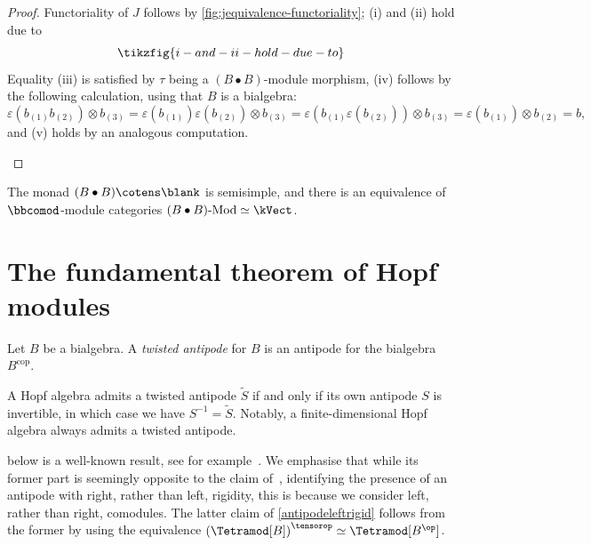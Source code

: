 \begin{proof}
  Functoriality of \(J\) follows by \cref{fig:jequivalence-functoriality};
  (i) and (ii) hold due to
  \[
    \tikzfig{i-and-ii-hold-due-to}
  \]
  Equality (iii) is satisfied by \(\tau\) being a \((B \bullet B)\)\hyp{}module morphism,
  (iv) follows by the following calculation, using that \(B\) is a bialgebra:
  \[
    \varepsilon(b_{(1)}b_{(2)}) \otimes b_{(3)}
    = \varepsilon(b_{(1)})\varepsilon(b_{(2)}) \otimes b_{(3)}
    = \varepsilon(b_{(1)}\varepsilon(b_{(2)})) \otimes b_{(3)}
    = \varepsilon(b_{(1)}) \otimes b_{(2)}
    = b,
  \]
  and (v) holds by an analogous computation.
  \begin{figure}[htbp]
    \centering
    \vspace{-\onelineskip}%
  \end{figure}
\end{proof}

\begin{corollary}
  The monad \((B \bullet B) \cotens \blank\) is semisimple, and there is an equivalence of \(\bbcomod\)\hyp{}module categories \((B \bullet B)\textnormal{-Mod} \simeq \kVect\).
\end{corollary}

\section{The fundamental theorem of Hopf modules}\label{sec:Hausser-Nill}

\begin{definition}
  Let \(B\) be a bialgebra.
  A \emph{twisted antipode} for \(B\) is an antipode for the bialgebra \(B^{\mathrm{cop}}\).
\end{definition}

\begin{remark}
  A Hopf algebra admits a twisted antipode \(\tilde{S}\) if and only if its own antipode \(S\) is invertible,
  in which case we have \(S^{-1} = \tilde{S}\).
  Notably, a finite\hyp{}dimensional Hopf algebra always admits a twisted antipode.
\end{remark}

 below is a well-known result, see for example~\cite[Theorem~5.4.1.(2)]{Etingof2015}.
We emphasise that while its former part is seemingly opposite to the claim of~\cite[Theorem~5.4.1.(2)]{Etingof2015},
identifying the presence of an antipode with right, rather than left, rigidity, this is because we consider left, rather than right, comodules.
The latter claim of \cref{antipodeleftrigid} follows from the former by using the equivalence \({(\Tetramod[B])}^{\tensorop} \simeq \Tetramod[B^{\op}]\).

